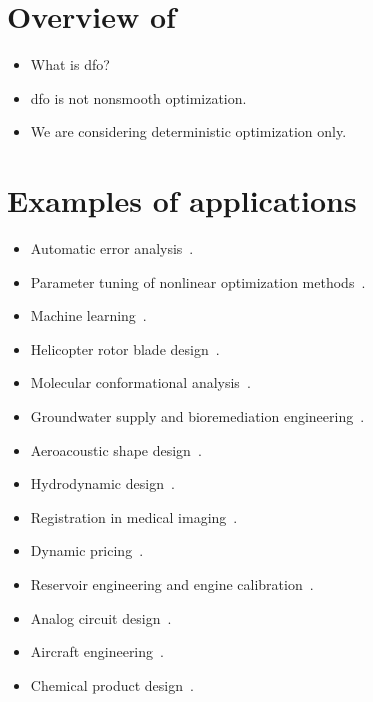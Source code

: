 \section{Overview of }

\begin{itemize}
    \item What is \gls{dfo}?
    \item \Gls{dfo} is not nonsmooth optimization.
    \item We are considering deterministic optimization only.
\end{itemize}

\section{Examples of  applications}

\begin{itemize}
    \item Automatic error analysis~\cite{Higham_1993,Higham_2002}.
    \item Parameter tuning of nonlinear optimization methods~\cite{Audet_Orban_2006}.
    \item Machine learning~\cite{Ghanbari_Scheinberg_2017,Qian_Yu_2021}.
    \item Helicopter rotor blade design~\cite{Booker_Etal_1998a,Booker_Etal_1998b,Serafini_1998}.
    \item Molecular conformational analysis~\cite{Alberto_Etal_2004,Meza_Martinez_1994}.
    \item Groundwater supply and bioremediation engineering~\cite{Fowler_Etal_2008,Mugunthan_Shoemaker_Regis_2005,Yoon_Shoemaker_1999}.
    \item Aeroacoustic shape design~\cite{Marsden_2004,Marsden_Etal_2004}.
    \item Hydrodynamic design~\cite{Duvigneau_Visonneau_2004}.
    \item Registration in medical imaging~\cite{Oeuvray_2005,Oeuvray_Bierlaire_2007}.
    \item Dynamic pricing~\cite{Levina_Etal_2009}.
    \item Reservoir engineering and engine calibration~\cite{Langouet_2011}.
    \item Analog circuit design~\cite{Latorre_Etal_2019}.
    \item Aircraft engineering~\cite{Gazaix_Etal_2019}.
    \item Chemical product design~\cite{Sun_Etal_2020}.
\end{itemize}


